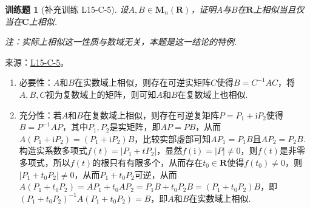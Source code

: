 \documentclass[UTF8,12pt,a4paper,fontset=fandol]{ctexart}
\newtheorem{exercise}{训练题}[section]
\begin{document}
\begin{exercise}[补充训练 L15-C-5]\label{prob:L15-C-5}
设$A,B\in \mathbf{M}_n(\mathbf{R})$，证明$A$与$B$在$\mathbf{R}$上相似当且仅当在$\mathbf{C}$上相似.

        {\kaishu 注：实际上相似这一性质与数域无关，本题是这一结论的特例.}
\end{exercise}
\noindent 来源：\href{https://github.com/yhwu-is/Linear-Algebra-Left-Undone/blob/new/%E8%AE%B2%E4%B9%89/%E4%B8%93%E9%A2%98/15%20%E7%9B%B8%E4%BC%BC%E6%A0%87%E5%87%86%E5%BD%A2%EF%BC%9A%E5%A4%8D%E6%95%B0%E5%9F%9F%E4%B8%8A%E7%9A%84%E5%B0%9D%E8%AF%95%E4%B8%8E%E7%90%86%E8%AE%BA.tex}{L15-C-5}。
\begin{solve}
\begin{enumerate}
                \item 必要性：$A$和$B$在实数域上相似，则存在可逆实矩阵$C$使得$B=C^{-1}AC$，将$A,B,C$视为复数域上的矩阵，则可知$A$和$B$在复数域上也相似.

                \item 充分性：若$A$和$B$在复数域上相似，则存在可逆复矩阵$P=P_1+\mathrm{i} P_2$使得$B=P^{-1}AP$，其中$P_1,P_2$是实矩阵，即$AP=PB$，从而$A(P_1+\mathrm{i} P_2)=(P_1+\mathrm{i} P_2)B$，比较实部虚部可知$AP_1=P_1B$且$AP_2=P_2B$. 构造实系数多项式$f(t)=|P_1+tP_2|$，显然$f(\mathrm{i})=|P|\neq 0$，则$f(t)$是非零多项式，所以$f(t)$的根只有有限多个，从而存在$t_0\in\mathbf{R}$使得$f(t_0)\neq 0$，则$|P_1+t_0P_2|\neq 0$，从而$P_1+t_0P_2$可逆，从而$A(P_1+t_0P_2)=AP_1+t_0AP_2=P_1B+t_0P_2B=(P_1+t_0P_2)B$，即$(P_1+t_0P_2)^{-1}A(P_1+t_0P_2)=B$，即$A$和$B$在实数域上相似.
            \end{enumerate}
\end{solve}
\end{document}
